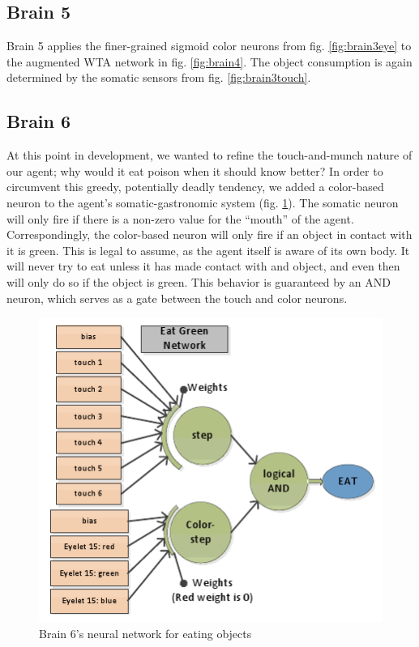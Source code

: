 \subsection{Brain 5}
Brain 5 applies the finer-grained sigmoid color neurons from 
fig. \ref{fig:brain3eye} to the augmented WTA network in 
fig. \ref{fig:brain4}. The object consumption is again determined by the 
somatic sensors from fig. \ref{fig:brain3touch}.

\subsection{Brain 6}
At this point in development, we wanted to refine the touch-and-munch nature
of our agent; why would it eat poison when it should know better? In order
to circumvent this greedy, potentially deadly tendency, we added a
color-based neuron to the agent's somatic-gastronomic system 
(fig. \ref{fig:brain6}). The somatic neuron will only fire if there is a
non-zero value for the ``mouth'' of the agent. Correspondingly, the
color-based neuron will only fire if an object in contact with it is green.
This is legal to assume, as the agent itself is aware of its own body. It will
never try to eat unless it has made contact with and object, and even then
will only do so if the object is green. This behavior is guaranteed by an
AND neuron, which serves as a gate between the touch and color neurons.

\begin{figure}
\begin{center}
  \includegraphics[scale=.7]{img/brain6.png}
  \caption{Brain 6's neural network for eating objects}
  \label{fig:brain6}
\end{center}
\end{figure}

